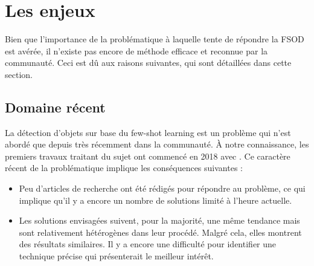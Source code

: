 \section{Les enjeux}
\label{sec:FSOD-verrous}
Bien que l'importance de la problématique à laquelle tente de répondre la FSOD est avérée, il n'existe pas encore de méthode efficace et reconnue par la communauté. Ceci est dû aux raisons suivantes, qui sont détaillées dans cette section.

\subsection*{Domaine récent}
\label{subsec:domaine-recent}

La détection d'objets sur base du few-shot learning est un problème qui n'est abordé que depuis très récemment dans la communauté. À notre connaissance, les premiers travaux traitant du sujet ont commencé en 2018 avec \cite{feature-reweighting}. Ce caractère récent de la problématique implique les conséquences suivantes :
\begin{itemize}
    \item Peu d'articles de recherche ont été rédigés pour répondre au problème, ce qui implique qu'il y a encore un nombre de solutions limité à l'heure actuelle.
    \item Les solutions envisagées suivent, pour la majorité, une même tendance mais sont relativement hétérogènes dans leur procédé. Malgré cela, elles montrent des résultats similaires. Il y a encore une difficulté pour identifier une technique précise qui présenterait le meilleur intérêt.
\end{itemize}

